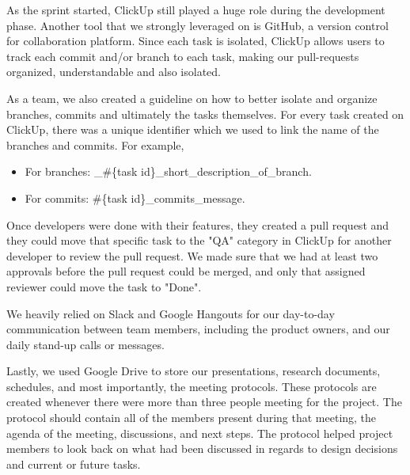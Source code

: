 As the sprint started, ClickUp still played a huge role during the development phase. Another tool that we strongly leveraged on is GitHub, a version control for collaboration platform. Since each task is isolated, ClickUp allows users to track each commit and/or branch to each task, making our pull-requests organized, understandable and also isolated.

As a team, we also created a guideline on how to better isolate and organize branches, commits and ultimately the tasks themselves. For every task created on ClickUp, there was a unique identifier which we used to link the name of the branches and commits. For example,

\begin{itemize}
	\item For branches: \_\#\{task id\}\_short\_description\_of\_branch.
	\item For commits: \#\{task id\}\_commits\_message.
\end{itemize}

Once developers were done with their features, they created a pull request and they could move that specific task to the "QA" category in ClickUp for another developer to review the pull request. We made sure that we had at least two approvals before the pull request could be merged, and only that assigned reviewer could move the task to "Done".

We heavily relied on Slack and Google Hangouts for our day-to-day communication between team members, including the product owners, and our daily stand-up calls or messages.

Lastly, we used Google Drive to store our presentations, research documents, schedules, and most importantly, the meeting protocols. These protocols are created whenever there were more than three people meeting for the project. The protocol should contain all of the members present during that meeting, the agenda of the meeting, discussions, and next steps. The protocol helped project members to look back on what had been discussed in regards to design decisions and current or future tasks.

